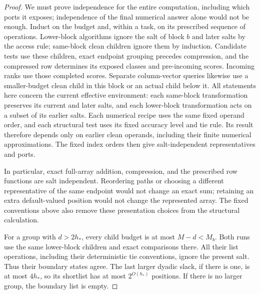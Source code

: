 \begin{proof}
We must prove independence for the entire computation, including which ports it exposes; independence of the final numerical answer alone would not be enough. Induct on the budget and, within a task, on its prescribed sequence of operations.  Lower-block algorithms ignore the salt of block $b$ and
later salts by the access rule; same-block clean children ignore them
by induction.  Candidate tests use these children, exact endpoint
grouping precedes compression, and the compressed row determines its
exposed classes and pre-incoming scores.  Incoming ranks use those
completed scores.  Separate column-vector queries likewise use a
smaller-budget clean child in this block or an actual child below it.
All statements here concern the current effective environment: each
same-block transformation preserves its current and later salts, and
each lower-block transformation acts on a subset of its earlier salts.
Each numerical recipe uses the same fixed operand
order, and each structural test uses its fixed accuracy level and tie
rule.  Its result therefore depends only on earlier clean operands,
including their finite numerical approximations.  The fixed index
orders then give salt-independent representatives and ports.

In particular, exact full-array addition, compression, and the prescribed
row functions are salt independent.  Reordering paths or choosing a
different representative of the same endpoint would not change an exact
sum; retaining an extra default-valued position would not change the
represented array.  The fixed conventions above also remove these
presentation choices from the structural calculation.

For a group with $d>2h_*$, every child budget is at most $M-d<M_b$.
Both runs use the same lower-block children and exact comparisons there.
All their list operations, including their deterministic tie conventions,
ignore the present salt.  Thus their boundary states agree.  The last
larger dyadic slack, if there is one, is at most $4h_*$, so its shortlist
has at most $2^{O(h_*)}$ positions.  If there is no larger group, the
boundary list is empty.


\end{proof}
